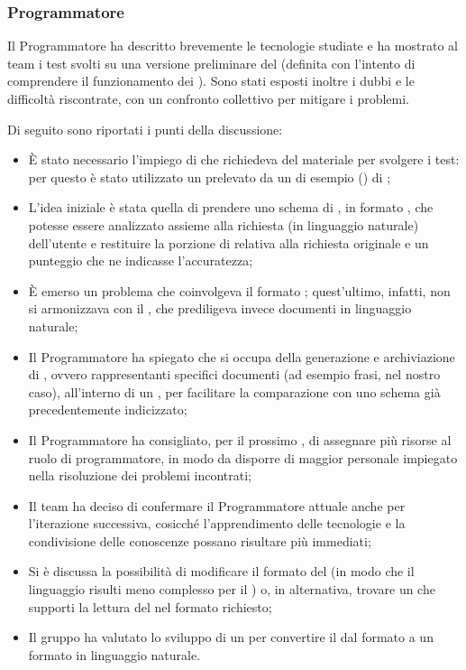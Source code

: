 \subsubsection{Programmatore} \label{sec:programmatore}
\par Il Programmatore ha descritto brevemente le tecnologie studiate e ha mostrato al team i test svolti su una versione preliminare del  (definita con l'intento di comprendere il funzionamento dei ). Sono stati esposti inoltre i dubbi e le difficoltà riscontrate, con un confronto collettivo per mitigare i problemi.
\par Di seguito sono riportati i punti della discussione:
\begin{itemize}
	\item È stato necessario l'impiego di  che richiedeva del materiale per svolgere i test: per questo è stato utilizzato un  prelevato da un  di esempio () di ;
	\item L'idea iniziale è stata quella di prendere uno schema di , in formato , che potesse essere analizzato assieme alla richiesta (in linguaggio naturale) dell'utente e restituire la porzione di  relativa alla richiesta originale e un punteggio che ne indicasse l'accuratezza;
	\item È emerso un problema che coinvolgeva il formato ; quest'ultimo, infatti, non si armonizzava con il , che prediligeva invece documenti in linguaggio naturale;
	\item Il Programmatore ha spiegato che  si occupa della generazione e archiviazione di , ovvero  rappresentanti specifici documenti (ad esempio frasi, nel nostro caso), all'interno di un , per facilitare la comparazione con uno schema già precedentemente indicizzato;
	\item Il Programmatore ha consigliato, per il prossimo , di assegnare più risorse al ruolo di programmatore, in modo da disporre di maggior personale impiegato nella risoluzione dei problemi incontrati;
	\item Il team ha deciso di confermare il Programmatore attuale anche per l’iterazione successiva, cosicché l'apprendimento delle tecnologie e la condivisione delle conoscenze possano risultare più immediati;
	\item Si è discussa la possibilità di modificare il formato del  (in modo che il linguaggio risulti meno complesso per il ) o, in alternativa, trovare un  che supporti la lettura del  nel formato richiesto;
	\item Il gruppo ha valutato lo sviluppo di un  per convertire il  dal formato  a un formato in linguaggio naturale.
\end{itemize}

